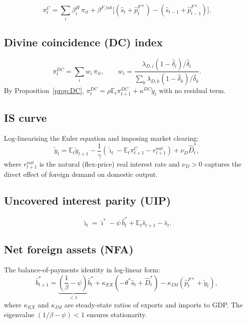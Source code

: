 \documentclass[11pt,a4paper]{article}
\newcommand{\E}{\mathbb{E}}
\newcommand{\wh}[1]{\widehat{#1}}
\providecommand{\tl}[1]{\widetilde{#1}}
\newcommand{\DC}{\pi^{DC}}
\begin{document}
\begin{equation}
\pi^C_t=\sum_i\beta^H_i\,\pi_{it}
+\beta^{F,\text{tot}}\!\bigl[(\wh s_t+\wh p^{F*}_t)-(\wh s_{t-1}+\wh p^{F*}_{t-1})\bigr].
\label{eq:CPIinfl}
\end{equation}

\subsection{Divine coincidence (DC) index}

\begin{equation}
\DC_t=\sum_i w_i\,\pi_{it},
\qquad
w_i=\frac{\lambda_{D,i}(1-\wh\delta_i)/\wh\delta_i}{\sum_k\lambda_{D,k}(1-\wh\delta_k)/\wh\delta_k}.
\label{eq:DCindex}
\end{equation}
By Proposition~\ref{prop:DC}, $\DC_t=\rho\E_t\DC_{t+1}+\kappa^{DC}\tl y_t$
with no residual term.

\subsection{IS curve}

Log-linearising the Euler equation and imposing market clearing:
\begin{equation}
\tl y_t=\E_t\tl y_{t+1}-\frac{1}{\gamma}\!\left(\wh\imath_t-\E_t\pi^C_{t+1}-r^{nat}_{t+1}\right)+\nu_D\wh D^*_t,
\label{eq:IS}
\end{equation}
where $r^{nat}_{t+1}$ is the natural (flex-price) real interest rate and
$\nu_D>0$ captures the direct effect of foreign demand on domestic output.

\subsection{Uncovered interest parity (UIP)}

\begin{equation}
\wh\imath_t=\wh\imath^*-\psi\,\wh b^*_t+\E_t\wh s_{t+1}-\wh s_t.
\label{eq:UIP}
\end{equation}

\subsection{Net foreign assets (NFA)}

The balance-of-payments identity in log-linear form:
\begin{equation}
\wh b^*_{t+1}=\underbrace{\left(\frac{1}{\beta}-\psi\right)}_{\displaystyle<1}\wh b^*_t
+\kappa_{EX}\!\left(-\theta^*\wh s_t+\wh D^*_t\right)
-\kappa_{IM}\!\left(\wh p^{F*}_t+\tl y_t\right),
\label{eq:NFA}
\end{equation}
where $\kappa_{EX}$ and $\kappa_{IM}$ are steady-state ratios of exports and
imports to GDP.  The eigenvalue $(1/\beta-\psi)<1$ ensures stationarity.
\end{document}
